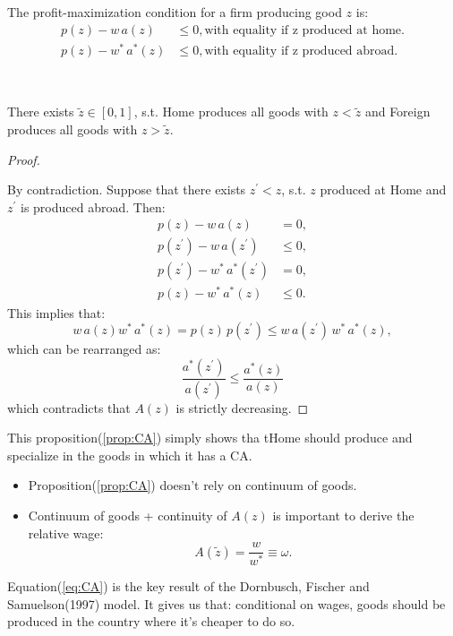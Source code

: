 The profit-maximization condition for a firm producing good $z$ is:
\begin{align*}
    p(z) - w\,a(z) &\leq 0, \text{with equality if z produced at home.} \\
    p(z) - w^*\,a^*(z) &\leq 0, \text{with equality if z produced abroad.}  
\end{align*}
\begin{proposition}\label{prop:CA}
    \

    There exists $\tilde{z} \in [0,1]$, s.t. Home produces all goods with $z < \tilde{z}$ 
    and Foreign produces all goods with $z > \tilde{z}$.
\end{proposition}
\begin{proof}
    \

    By contradiction. Suppose that there exists $z^{\prime} < z$, s.t. $z$ produced at Home
    and $z^{\prime} $ is produced abroad. Then:
    \begin{align*}
        p(z) - w\,a(z) &= 0, \\
        p(z^{\prime}) - w\,a(z^{\prime}) &\leq 0, \\
        p(z^{\prime}) - w^*\,a^*(z^{\prime}) &= 0, \\
        p(z) - w^*\,a^*(z) &\leq 0.
    \end{align*}
    This implies that:
    \[w\,a(z)w^*\,a^*(z) = p(z)\,p(z^{\prime}) \leq w\,a(z^{\prime})\,w^*\,a^*(z),\]
    which can be rearranged as:
    \[\frac{a^*(z^{\prime})}{a(z^{\prime})} \leq \frac{a^*(z)}{a(z)}\]
    which contradicts that $A(z)$ is strictly decreasing.
\end{proof}

This proposition(\ref{prop:CA}) simply shows tha tHome should produce and specialize in
the goods in which it has a CA.

\begin{note}
    \begin{itemize}
        \item Proposition(\ref{prop:CA}) doesn't rely on continuum of goods.
        \item Continuum of goods + continuity of $A(z)$ is important to derive the relative wage:
        \begin{equation}\label{eq:CA}
            A(\tilde{z}) = \frac{w}{w^*} \equiv \omega.
        \end{equation}
    \end{itemize}
    Equation(\ref{eq:CA}) is the key result of the Dornbusch, Fischer and Samuelson(1997) model.
    It gives us that: conditional on wages, goods should be produced in the country where it's cheaper to do so.
\end{note}

